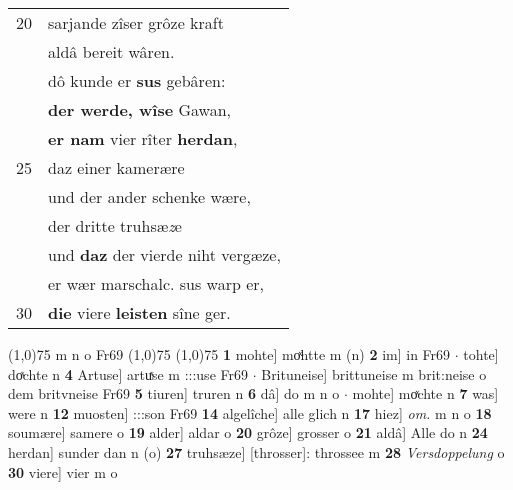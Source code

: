 \documentclass[8pt,a4paper,notitlepage]{article}
\begin{document}
\begin{table}[ht]
\begin{minipage}[t]{0.5\linewidth}
\begin{tabular}{rl}
20 & sarjande zîser grôze kraft\\ 
 & aldâ bereit wâren.\\ 
 & dô kunde er \textbf{sus} gebâren:\\ 
 & \textbf{der werde, wîse} Gawan,\\ 
 & \textbf{er nam} vier rîter \textbf{herdan},\\ 
25 & daz einer kamerære\\ 
 & und der ander schenke wære,\\ 
 & der dritte truhsæ\textit{z}e\\ 
 & und \textbf{daz} der vierde niht vergæze,\\ 
 & er wær marschalc. sus warp er,\\ 
30 & \textbf{die} viere \textbf{leisten} sîne ger.\\ 
\end{tabular}
\scriptsize
\line(1,0){75} \newline
m n o Fr69 \newline
\line(1,0){75} \newline
\newline
\line(1,0){75} \newline
\textbf{1} mohte] moͯhtte m (n) \textbf{2} im] in Fr69  $\cdot$ tohte] doͯchte n \textbf{4} Artuse] artuͯse m :::use Fr69  $\cdot$ Brituneise] brittuneise m brit:neise o dem britvneise Fr69 \textbf{5} tiuren] truren n \textbf{6} dâ] do m n o  $\cdot$ mohte] moͯchte n \textbf{7} was] were n \textbf{12} muosten] :::son Fr69 \textbf{14} algelîche] alle glich n \textbf{17} hiez] \textit{om.} m n o \textbf{18} soumære] samere o \textbf{19} alder] aldar o \textbf{20} grôze] grosser o \textbf{21} aldâ] Alle do n \textbf{24} herdan] sunder dan n (o) \textbf{27} truhsæze] [throsser]: throssee m \textbf{28} \textit{Versdoppelung} o  \textbf{30} viere] vier m o \newline
\end{minipage}
\end{table}
\newpage
\end{document}
